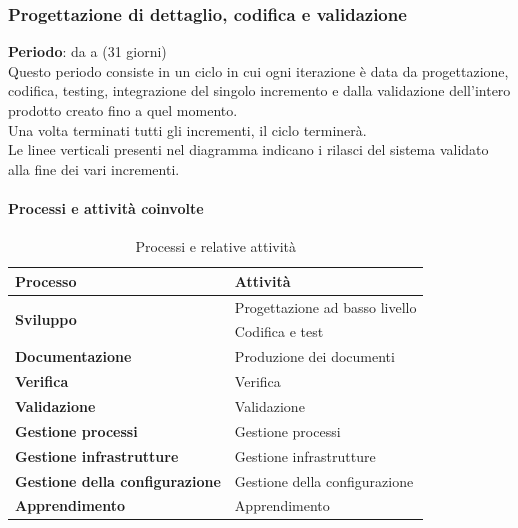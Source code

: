 	\newpage
	\subsubsection {Progettazione di dettaglio, codifica e validazione}
		\textbf{Periodo}: da  a  (31 giorni)\\
		Questo periodo consiste in un ciclo in cui ogni iterazione è data da progettazione, codifica, testing, integrazione del singolo incremento e dalla validazione dell'intero prodotto creato fino a quel momento.
		\\Una volta terminati tutti gli incrementi, il ciclo terminerà.
		\\Le linee verticali presenti nel diagramma indicano i rilasci del sistema validato alla fine dei vari incrementi.
		\paragraph{Processi e attività coinvolte}
			\begin{table}[H]
				\centering
				\begin{tabular}{ll}
					\toprule
					\textbf{Processo}                           & \textbf{Attività}              \\
					\midrule
					\multirow{2}{*}{\textbf{Sviluppo}}          & Progettazione ad basso livello \\
					& Codifica e test \\
					\midrule
					\textbf{Documentazione}            & Produzione dei documenti       \\
					\midrule
					\textbf{Verifica}                  & Verifica                       \\
					\midrule
					\textbf{Validazione}               & Validazione                    \\
					\midrule
					\textbf{Gestione processi} 					& Gestione processi              \\
					\midrule
					\textbf{Gestione infrastrutture}				& Gestione infrastrutture        \\
					\midrule
					\textbf{Gestione della configurazione}				& Gestione della configurazione        \\
					\midrule
					\textbf{Apprendimento} 						& Apprendimento                 \\
					\bottomrule
				\end{tabular}
				\caption{Processi e relative attività}
				\label{Pdrob-ProcessiAttività}
			\end{table}
